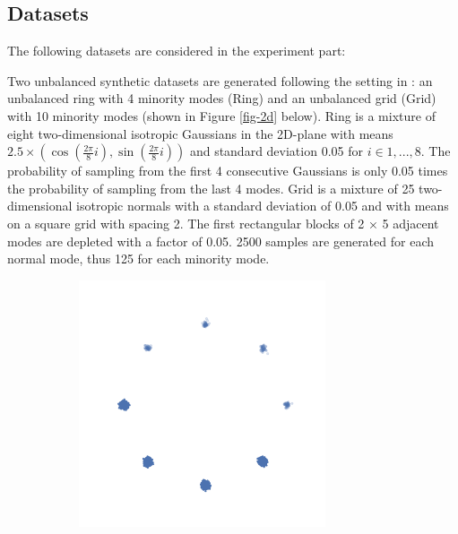 \subsection{Datasets}
\label{subsec-expr-datasets}
The following datasets are considered in the experiment part:
\begin{description}[leftmargin=0pt]
   \item[Synthetic ring/grid datasets] Two unbalanced synthetic datasets are generated following the setting in \cite{schreursLeverageScoreSampling2022}: an unbalanced ring with 4 minority modes (Ring) and an unbalanced grid (Grid) with 10 minority modes (shown in Figure \ref{fig-2d} below). Ring is a mixture of eight two-dimensional isotropic Gaussians in the 2D-plane with means $2.5 \times (\cos(\frac{2\pi}{8}i), \sin(\frac{2\pi}{8}i))$ and standard deviation 0.05 for $i\in{ 1, . . . , 8 }$. The probability of sampling from the ﬁrst 4 consecutive Gaussians is only 0.05 times the probability of sampling from the last 4 modes. Grid is a mixture of 25 two-dimensional isotropic normals with a standard deviation of 0.05 and with means on a square grid with spacing 2. The ﬁrst rectangular blocks of 2 × 5 adjacent modes are depleted with a factor of 0.05. 2500 samples are generated for each normal mode, thus 125 for each minority mode. 
\begin{figure}[H]
    \centering
    \begin{subfigure}{0.45\textwidth}
        \centering
        \includegraphics[width=0.8\textwidth]{Figures/Methods/ring_dataset.png}
    \end{subfigure}

\end{figure}
\end{description}
